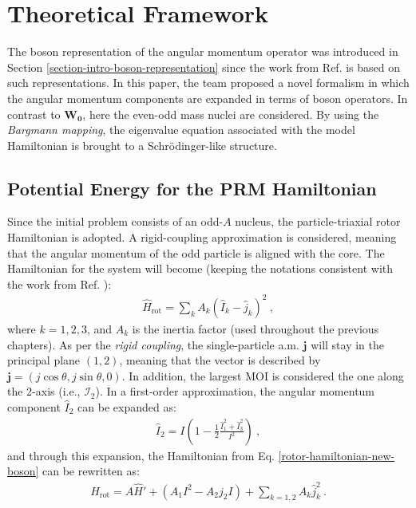 \section{Theoretical Framework}
\label{section-new-boson-theoretical-framework}

The boson representation of the angular momentum operator was introduced in Section \ref{section-intro-boson-representation} since the work from Ref. \cite{raduta2020new} is based on such representations. In this paper, the team proposed a novel formalism in which the angular momentum components are expanded in terms of boson operators. In contrast to $\mathbf{W_0}$, here the even-odd mass nuclei are considered. By using the \emph{Bargmann mapping}, the eigenvalue equation associated with the model Hamiltonian is brought to a Schrödinger-like structure.

\subsection{Potential Energy for the PRM Hamiltonian}

Since the initial problem consists of an odd-$A$ nucleus, the particle-triaxial rotor Hamiltonian is adopted. A rigid-coupling approximation is considered, meaning that the angular momentum of the odd particle is aligned with the core. The Hamiltonian for the system will become (keeping the notations consistent with the work from Ref. \cite{raduta2020new}):
\begin{align}
    \hat{H}_\text{rot}=\sum_{k}A_k\left(\hat{I}_k-\hat{j}_k\right)^2\ ,
    \label{rotor-hamiltonian-new-boson}
\end{align}
where $k=1,2,3$, and $A_k$ is the inertia factor (used throughout the previous chapters). As per the \emph{rigid coupling}, the single-particle a.m. $\mathbf{j}$ will stay in the principal plane $(1,2)$, meaning that the vector is described by $\mathbf{j}=\left(j\cos\theta,j\sin\theta,0\right)$. In addition, the largest MOI is considered the one along the 2-axis (i.e., $\mathcal{I}_2$). In a first-order approximation, the angular momentum component $\hat{I}_2$ can be expanded as:
\begin{align}
    \hat{I}_2=I\left(1-\frac{1}{2}\frac{\hat{I}_1^2+\hat{I}_3^2}{I^2}\right)\ ,
\end{align}
and through this expansion, the Hamiltonian from Eq. \ref{rotor-hamiltonian-new-boson} can be rewritten as:
\begin{align}
    \hat{H}_\text{rot}=A\hat{H}'+\left(A_1I^2-A_2j_2I\right)+\sum_{k=1,2}A_k\hat{j}_k^2\ .
    \label{rewritten-rotor-hamiltonian-new-boson}
\end{align}

